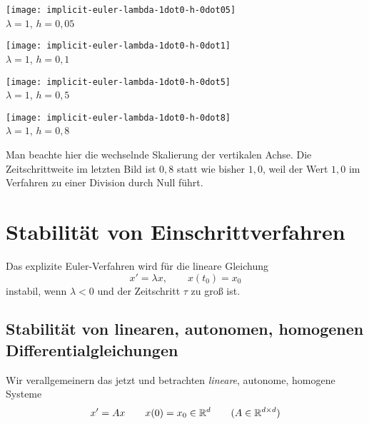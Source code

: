 \begin{center}
	\begin{minipage}{0.49\textwidth}
		\centering
		\texttt{[image: implicit-euler-lambda-1dot0-h-0dot05]} \\
		$\lambda=1$, $h = 0{,}05$
	\end{minipage}
	\begin{minipage}{0.49\textwidth}
		\centering
		\texttt{[image: implicit-euler-lambda-1dot0-h-0dot1]} \\
		$\lambda=1$, $h = 0{,}1$
	\end{minipage}
\end{center}
\begin{center}
	\begin{minipage}{0.49\textwidth}
		\centering
		\texttt{[image: implicit-euler-lambda-1dot0-h-0dot5]} \\
		$\lambda=1$, $h = 0{,}5$
	\end{minipage}
	\begin{minipage}{0.49\textwidth}
		\centering
		\texttt{[image: implicit-euler-lambda-1dot0-h-0dot8]} \\
		$\lambda=1$, $h = 0{,}8$
	\end{minipage}
\end{center}

Man beachte hier die wechselnde Skalierung der vertikalen Achse.  Die Zeitschrittweite im letzten Bild ist $0{,}8$ statt wie bisher $1{,}0$, weil der Wert $1{,}0$ im Verfahren zu einer Division durch Null führt.


\section{Stabilität von Einschrittverfahren}

Das explizite Euler-Verfahren wird für die lineare Gleichung
\begin{equation*}
	x' = \lambda x, \qquad x(t_0) = x_0
\end{equation*}
instabil, wenn $\lambda <0$ und der Zeitschritt $\tau$ zu groß ist.

\subsection{Stabilität von linearen, autonomen, homogenen Differentialgleichungen}

Wir verallgemeinern das jetzt und betrachten \textit{lineare}, autonome, homogene Systeme
\begin{equation*}
	x' = Ax \qquad x(0)=x_0 \in \mathbb R^d \qquad (A \in \mathbb R^{d \times d})
\end{equation*}

